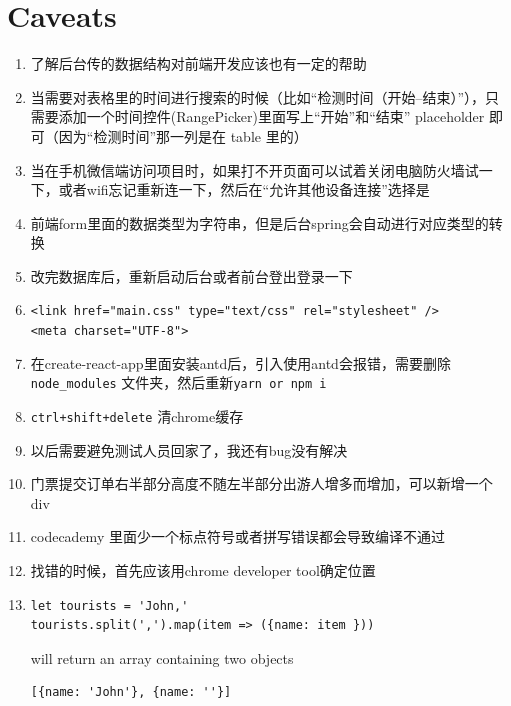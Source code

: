 \documentclass[a4paper, 12pt]{article}
\begin{document}
\section{Caveats}
\begin{enumerate}

\item 了解后台传的数据结构对前端开发应该也有一定的帮助

\item 当需要对表格里的时间进行搜索的时候（比如“检测时间（开始--结束）”），只需要添加一个时间控件(RangePicker)里面写上“开始”和“结束” placeholder 即可（因为“检测时间”那一列是在 table 里的）

\item 当在手机微信端访问项目时，如果打不开页面可以试着关闭电脑防火墙试一下，或者wifi忘记重新连一下，然后在“允许其他设备连接”选择是

\item 前端form里面的数据类型为字符串，但是后台spring会自动进行对应类型的转换

\item 改完数据库后，重新启动后台或者前台登出登录一下

\item \verb|<link href="main.css" type="text/css" rel="stylesheet" />|\\
\verb|<meta charset="UTF-8">|

\item 在create-react-app里面安装antd后，引入使用antd会报错，需要删除\\ \verb|node_modules| 文件夹，然后重新\verb|yarn or npm i|

\item \verb|ctrl+shift+delete| 清chrome缓存

\item 以后需要避免测试人员回家了，我还有bug没有解决

\item 门票提交订单右半部分高度不随左半部分出游人增多而增加，可以新增一个div

\item codecademy 里面少一个标点符号或者拼写错误都会导致编译不通过

\item 找错的时候，首先应该用chrome developer tool确定位置

\item 
\begin{verbatim}
let tourists = 'John,'
tourists.split(',').map(item => ({name: item }))
\end{verbatim}
will return an array containing two objects
\begin{verbatim}
[{name: 'John'}, {name: ''}]
\end{verbatim}


\end{enumerate}
\end{document}
